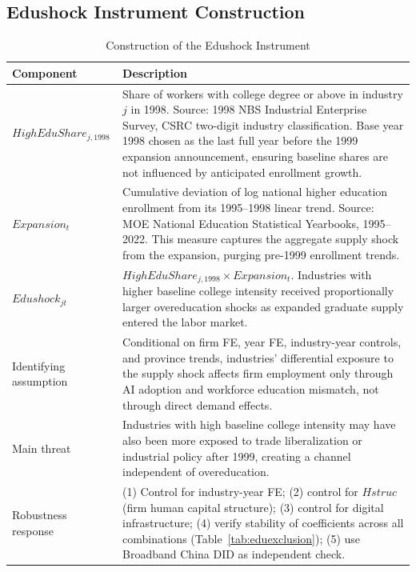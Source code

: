 \documentclass[12pt,a4paper]{article}
\theoremstyle{predstyle}
\theoremstyle{plain}
\begin{document}
\begin{appendices}
\section{Edushock Instrument Construction}
\label{app:edushock}

\begin{table}[H]
\centering
\caption{Construction of the Edushock Instrument}
\label{tab:edushock}
\begin{threeparttable}
\footnotesize
\begin{tabular}{p{3.5cm}p{10cm}}
\toprule
Component & Description \\
\midrule
$HighEduShare_{j,1998}$ & Share of workers with college degree or above in industry $j$ in 1998. Source: 1998 NBS Industrial Enterprise Survey, CSRC two-digit industry classification. Base year 1998 chosen as the last full year before the 1999 expansion announcement, ensuring baseline shares are not influenced by anticipated enrollment growth. \\[4pt]
$Expansion_t$ & Cumulative deviation of log national higher education enrollment from its 1995--1998 linear trend. Source: MOE National Education Statistical Yearbooks, 1995--2022. This measure captures the aggregate supply shock from the expansion, purging pre-1999 enrollment trends. \\[4pt]
$Edushock_{jt}$ & $HighEduShare_{j,1998} \times Expansion_t$. Industries with higher baseline college intensity received proportionally larger overeducation shocks as expanded graduate supply entered the labor market. \\[4pt]
Identifying assumption & Conditional on firm FE, year FE, industry-year controls, and province trends, industries' differential exposure to the supply shock affects firm employment only through AI adoption and workforce education mismatch, not through direct demand effects. \\[4pt]
Main threat & Industries with high baseline college intensity may have also been more exposed to trade liberalization or industrial policy after 1999, creating a channel independent of overeducation. \\[4pt]
Robustness response & (1) Control for industry-year FE; (2) control for $Hstruc$ (firm human capital structure); (3) control for digital infrastructure; (4) verify stability of coefficients across all combinations (Table~\ref{tab:eduexclusion}); (5) use Broadband China DID as independent check. \\
\bottomrule
\end{tabular}
\end{threeparttable}
\end{table}


\end{appendices}
\end{document}
